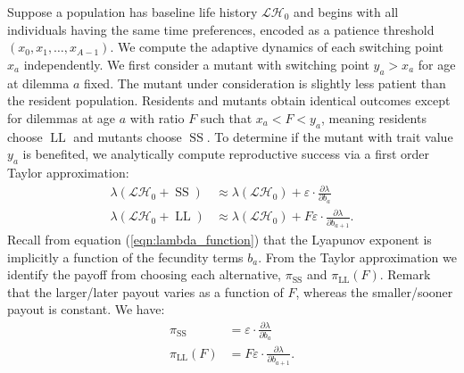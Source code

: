 \documentclass[titlepage, hidelinks, 12pt]{article}
\theoremstyle{plain}
\theoremstyle{remark}
\theoremstyle{definition}
\newcommand{\varSS}{\frac{\partial \lambda}{ \partial b_{a}}}
\newcommand{\varLL}{\frac{\partial \lambda}{ \partial b_{a+1}}}
\newcommand{\LH}{\mathcal{LH}}
\DeclareMathOperator{\smallersooner}{SS}
\DeclareMathOperator{\largerlater}{LL}
\begin{document}
Suppose a population has baseline life history $\LH_0$ and begins with all individuals having the same time preferences,
encoded as a patience threshold $(x_0, x_1, \ldots, x_{A-1})$. We compute the adaptive dynamics of each switching point
$x_a$ independently. We first consider a mutant with switching point $y_a > x_a$ for age at dilemma $a$ fixed. 
The mutant under consideration is slightly less patient than the resident population. Residents and mutants obtain identical outcomes except for dilemmas
at age $a$ with ratio $F$ such that $x_a < F < y_a$, meaning residents choose $\largerlater$ and mutants choose $\smallersooner$. 
To determine if the mutant with trait value $y_a$ is benefited, we analytically compute reproductive success via a first order Taylor approximation:
\begin{align}
    \lambda(\LH_0 + \smallersooner) &\approx \lambda(\LH_0) + \varepsilon \cdot \varSS \\
    \lambda(\LH_0 + \largerlater) &\approx \lambda(\LH_0) + F\varepsilon \cdot \varLL.
\end{align}
Recall from equation (\ref{eqn:lambda_function}) that the Lyapunov exponent is implicitly a function of the fecundity terms $b_a$. 
From the Taylor approximation we identify the payoff from choosing each alternative, 
$\pi_{\smallersooner}$ and $\pi_{\largerlater}(F)$. Remark that the larger/later payout
varies as a function of $F$, whereas the smaller/sooner payout is constant. We have: 
\begin{align}
    \pi_{\smallersooner} &= \varepsilon\cdot \varSS \label{eqn:varss} \\ 
    \pi_{\largerlater}(F) &= F\varepsilon\cdot \varLL. \label{eqn:varll}
\end{align}
\end{document}
